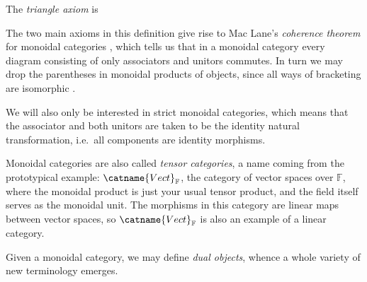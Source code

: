 \begin{definition}
\begin{center}
\end{center}
The \emph{triangle axiom} is
\begin{center}
\end{center}
\end{definition}
The two main axioms in this definition give rise to Mac Lane's \emph{coherence theorem} for monoidal categories \cite[Section VII.2]{maclane1998categories}, which tells us that in a monoidal category every diagram consisting of only associators and unitors commutes. In turn we may drop the parentheses in monoidal products of objects, since all ways of bracketing are isomorphic \cite[Theorem 2.9.2]{etingof2015tensor}. 

We will also only be interested in strict monoidal categories, which means that the associator and both unitors  are taken to be the identity natural transformation, i.e.\ all components are identity morphisms.

\bigno
Monoidal categories are also called \emph{tensor categories}, a name coming from the prototypical example: $\catname{Vect}_\mathbb{F}$, the category of vector spaces over $\mathbb{F}$, where the monoidal product is just your usual tensor product, and the field itself serves as the monoidal unit. The morphisms in this category are linear maps between vector spaces, so $\catname{Vect}_\mathbb{F}$ is also an example of a linear category.

\bigno Given a monoidal category, we may define \emph{dual objects}, whence a whole variety of new terminology emerges.

